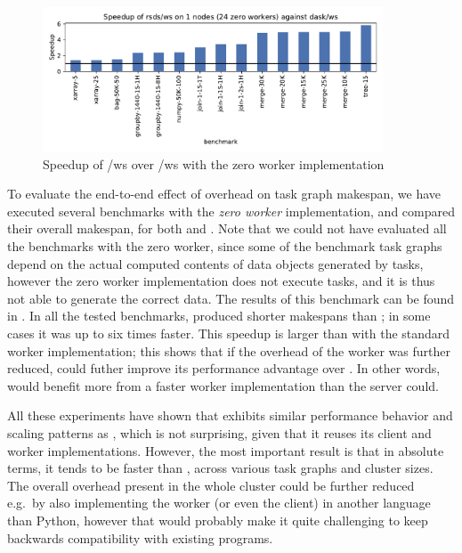 \begin{figure}
	\centering
	\includegraphics[width=0.9\textwidth]{./imgs/rsds/charts/speedup-zw-rsds-ws-1}
	\caption{Speedup of \rsds{}/ws over \dask{}/ws with the zero worker
	implementation}
	\label{fig:rsds-zero-worker-speedup}
\end{figure}

To evaluate the end-to-end effect of overhead on task graph makespan, we have executed several
benchmarks with the \emph{zero worker} implementation, and compared their overall
makespan, for both \dask{} and \rsds{}. Note that we could
not have evaluated all the benchmarks with the zero worker, since some of the benchmark task graphs
depend on the actual computed contents of data objects generated by tasks, however the zero worker
implementation does not execute tasks, and it is thus not able to generate the correct data. The
results of this benchmark can be found in . In all the tested
benchmarks, \rsds{} produced shorter makespans than
\dask{}; in some cases it was up to six times faster. This speedup is larger
than with the standard worker implementation; this shows that if the overhead of the worker was
further reduced, \rsds{} could futher improve its performance advantage over
\dask{}. In other words, \rsds{} would benefit more from a
faster worker implementation than the \dask{} server could.

All these experiments have shown that \rsds{} exhibits similar performance
behavior and scaling patterns as \dask{}, which is not surprising, given that
it reuses its client and worker implementations. However, the most important result is that in
absolute terms, it tends to be faster than \dask{}, across various task graphs
and cluster sizes. The overall overhead present in the whole \rsds{} cluster
could be further reduced e.g.\ by also implementing the worker (or even the client) in another
language than Python, however that would probably make it quite challenging to keep backwards
compatibility with existing \dask{} programs.

